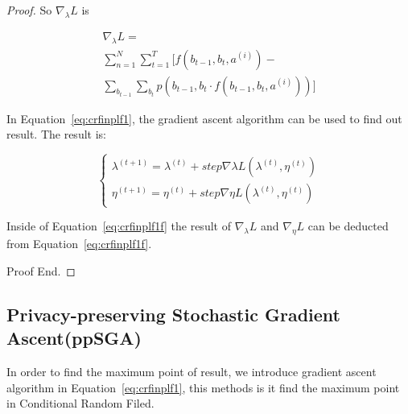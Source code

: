 \documentclass[journal,transmag]{IEEEtran}
\begin{document}
\begin{proof}
So $\nabla_{\lambda} L $ is 

\begin{equation}\label{eq:crfinplf1}
\begin{array}{ll}
   \nabla_{\lambda} L = \\
   \sum^N_{n=1} \sum^T_{t=1} \lbrack f(b_{t-1},b_t,a^{(i)}) - \\ \sum_{b_{t-1}} \sum_{b_t} p(b_{t-1},b_t \cdot f(b_{t-1},b_t,a^{(i)})) \rbrack
\end{array}
\end{equation}

In Equation~\ref{eq:crfinplf1}, the gradient ascent algorithm can be used to find out result. The result is:

\begin{equation}\label{eq:crfinplf1f}
   \left\{\begin{array}{cc}
   \lambda^{(t+1)} = \lambda^{(t)} + step  \nabla \lambda  L(\lambda^{(t)},\eta^{(t)}) \\
   \eta^{(t+1)} =  \eta^{(t)} +  step  \nabla \eta L(\lambda^{(t)},\eta^{(t)}) 
\end{array}\right.
\end{equation}

Inside of  Equation~\ref{eq:crfinplf1f} the result of $ \nabla_{\lambda} L$ and $ \nabla_{\eta} L$ can be deducted from Equation~\ref{eq:crfinplf1f}.

Proof End.
\end{proof}




\subsection{Privacy-preserving Stochastic Gradient Ascent(ppSGA)}

In order to find the maximum point of result, we introduce gradient ascent algorithm in Equation~\ref{eq:crfinplf1}, this methods is it find the maximum point in Conditional Random Filed.  
\end{document}
